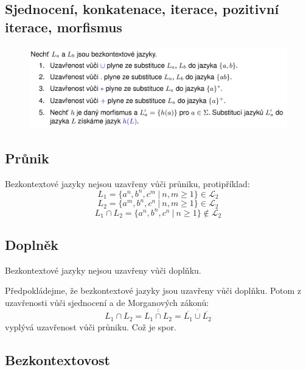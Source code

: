 \subsection{Sjednocení, konkatenace, iterace, pozitivní iterace, morfismus}

\begin{figure}[H]
    \centering
    \includegraphics[width=1\linewidth]{uzaverove_vlastnosti_L2_02.pdf}
\end{figure}

\subsection{Průnik}

\begin{compactitem}
    \item Bezkontextové jazyky nejsou uzavřeny vůči průniku, protipříklad:
    $$ L_1 = \{ a^n, b^n, c^m ~|~ n, m \geq 1 \} \in \mathcal{L}_2$$
    $$ L_2 = \{ a^m, b^n, c^n ~|~ n, m \geq 1 \} \in \mathcal{L}_2$$
    $$ L_1 \cap L_2 = \{ a^n, b^n, c^n ~|~ n \geq 1 \}  \not\in \mathcal{L}_2$$
\end{compactitem}

\subsection{Doplněk}

\begin{compactitem}
    \item Bezkontextové jazyky nejsou uzavřeny vůči doplňku.

    \item Předpokládejme, že bezkontextové jazyky jsou uzavřeny vůči doplňku. Potom z uzavřenosti vůči sjednocení a de Morganových zákonů: $$L_1 \cap L_2 = \overline{\overline{L_1 \cap L_2}} = \overline{\overline{L_1} \cup \overline{L_2}}$$ vyplývá uzavřenost vůči průniku. Což je spor.
\end{compactitem}

\subsection{Bezkontextovost}

